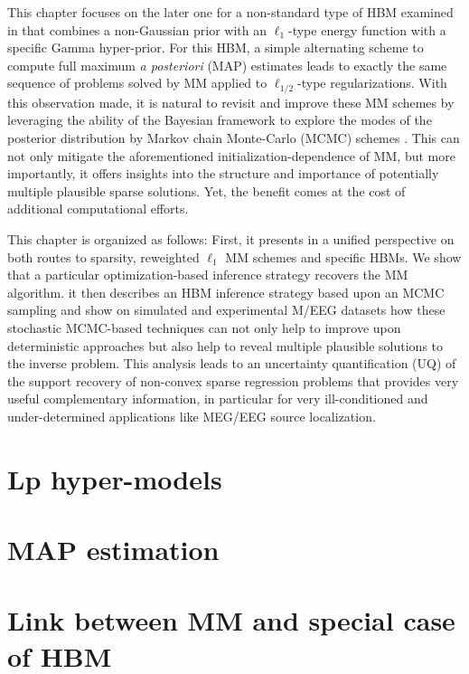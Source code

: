 This chapter focuses on the later one for a non-standard type of HBM examined in \cite{Lu14} that combines a non-Gaussian prior with an $\ell_{1}$-type energy function with a specific Gamma hyper-prior.
For this HBM, a simple alternating scheme to compute full maximum \emph{a posteriori} (MAP) estimates leads to exactly the same sequence of problems solved by MM applied to $\ell_{1/2}$-type regularizations.
With this observation made, it is natural to revisit and improve these MM schemes by leveraging the ability of the Bayesian framework to explore the modes of the posterior distribution by Markov chain Monte-Carlo (MCMC) schemes \cite{RoCa05,KaSo05}. This can not only mitigate the aforementioned initialization-dependence of MM, but more importantly, it offers insights into the structure and importance of potentially multiple plausible sparse solutions. Yet, the benefit comes at the cost of additional computational efforts.

This chapter is organized as follows: First, it presents in a unified
perspective on both routes to sparsity, \ie reweighted $\ell_1$ MM schemes
and specific HBMs. We show that a particular optimization-based inference strategy recovers the MM algorithm. it then describes an HBM inference strategy based upon an MCMC sampling and show on simulated and experimental M/EEG datasets how these stochastic MCMC-based techniques can not only help to improve upon deterministic approaches but also help to reveal multiple plausible solutions to the inverse problem. This analysis leads to an uncertainty quantification (UQ) of the support recovery of non-convex sparse regression problems that provides very useful complementary information, in particular for very ill-conditioned and under-determined applications like MEG/EEG source localization.

\section{Lp hyper-models}

\section{MAP estimation}

\section{Link between MM and special case of HBM}

